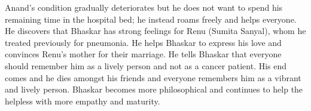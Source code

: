 \documentclass[11pt]{article}
\begin{document}
Anand's condition gradually deteriorates but he does not want to spend his remaining time in the hospital bed; he instead roams freely and helps everyone. He discovers that Bhaskar has strong feelings for Renu (Sumita Sanyal), whom he treated previously for pneumonia. He helps Bhaskar to express his love and convinces Renu's mother for their marriage. He tells Bhaskar that everyone should remember him as a lively person and not as a cancer patient. His end comes and he dies amongst his friends and everyone remembers him as a vibrant and lively person. Bhaskar becomes more philosophical and continues to help the helpless with more empathy and maturity.
\end{document}
